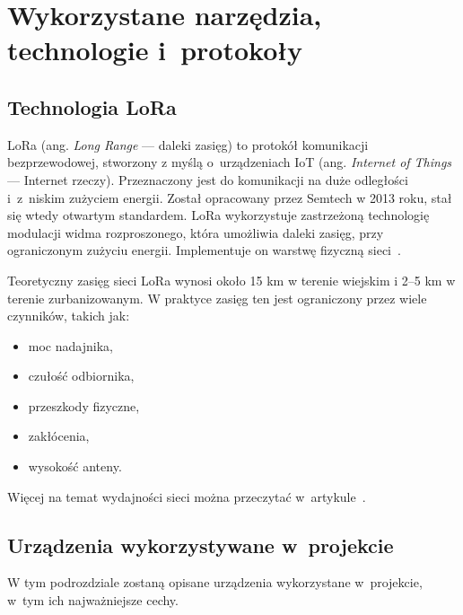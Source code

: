 
\chapter{Wykorzystane narzędzia, technologie i~protokoły}

\section{Technologia LoRa}
LoRa (ang. \emph{Long Range} — daleki zasięg) to protokół komunikacji bezprzewodowej, stworzony z myślą o~urządzeniach IoT (ang. \emph{Internet of Things} — Internet rzeczy).
Przeznaczony jest do komunikacji na duże odległości i~z~niskim zużyciem energii.
Został opracowany przez Semtech w 2013 roku, stał się wtedy otwartym standardem.
LoRa wykorzystuje zastrzeżoną technologię modulacji widma rozproszonego, która umożliwia daleki zasięg, przy ograniczonym zużyciu energii.
Implementuje on warstwę fizyczną sieci~\cite{lora:about}.

Teoretyczny zasięg sieci LoRa wynosi około 15 km w terenie wiejskim i 2--5 km w terenie zurbanizowanym.
W praktyce zasięg ten jest ograniczony przez wiele czynników, takich jak:
\begin{itemize}
    \item moc nadajnika,
    \item czułość odbiornika,
    \item przeszkody fizyczne,
    \item zakłócenia,
    \item wysokość anteny.
\end{itemize}


Więcej na temat wydajności sieci można przeczytać w~artykule~\cite{bib:lora-performance}.

\section{Urządzenia wykorzystywane w~projekcie}

W tym podrozdziale zostaną opisane urządzenia wykorzystane w~projekcie, w~tym ich najważniejsze cechy.

